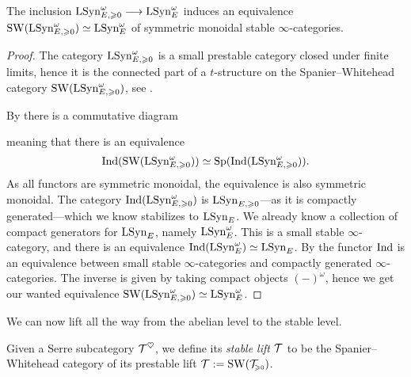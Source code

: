 \begin{theorem}
    \label{ch3:add:thm:prestable-freyd-stabilizes-to-stable-Freyd}
    The inclusion $\mathrm{LSyn}_{E, \geqslant 0}^\omega \longrightarrow \mathrm{LSyn}_{E}^\omega$ induces an equivalence $\operatorname{SW}(\mathrm{LSyn}_{E, \geqslant 0}^\omega)\simeq \mathrm{LSyn}_{E}^\omega$ of symmetric monoidal stable $\infty$-categories. 
\end{theorem}
\begin{proof}
    The category $\mathrm{LSyn}_{E, \geqslant 0}^\omega$ is a small prestable category closed under finite limits, hence it is the connected part of a $t$-structure on the Spanier--Whitehead category $\operatorname{SW}(\mathrm{LSyn}_{E, \geqslant 0}^\omega)$, see \cite[C.1.1, C.1.2]{lurie_SAG}. 

    By \cite[C.1.1.6]{lurie_SAG} there is a commutative diagram
    \begin{center}
    \end{center}
    meaning that there is an equivalence
    \[\operatorname{Ind}(\operatorname{SW}(\mathrm{LSyn}_{E, \geqslant 0}^\omega))\simeq \mathrm{Sp}(\operatorname{Ind}(\mathrm{LSyn}_{E, \geqslant 0}^\omega)).\]
    As all functors are symmetric monoidal, the equivalence is also symmetric monoidal. The category $\operatorname{Ind}(\mathrm{LSyn}_{E, \geqslant 0}^\omega)$ is $\mathrm{LSyn}_{E, \geqslant 0}$---as it is compactly generated---which we know stabilizes to $\mathrm{LSyn}_{E}$. We already know a collection of compact generators for $\mathrm{LSyn}_{E}$, namely $\mathrm{LSyn}_{E}^\omega$. This is a small stable $\infty$-category, and there is an equivalence $\operatorname{Ind}(\mathrm{LSyn}_{E}^\omega)\simeq \mathrm{LSyn}_{E}$. By \cite[5.3.2.11(3)]{Lurie_HA} the functor $\operatorname{Ind}$ is an equivalence between small stable $\infty$-categories and compactly generated $\infty$-categories. The inverse is given by taking compact objects $(-)^\omega$, hence we get our wanted equivalence $\operatorname{SW}(\mathrm{LSyn}_{E, \geqslant 0}^\omega)\simeq \mathrm{LSyn}_{E}^\omega$. 
\end{proof}

We can now lift all the way from the abelian level to the stable level. 

\begin{definition}
    Given a Serre subcategory $\mathcal{T}^\heartsuit$, we define its \emph{stable lift} $\mathcal{T}$ to be the Spanier--Whitehead category of its prestable lift $\mathcal{T}:= \operatorname{SW}(\mathcal{T}_{\hspace{-1pt}\scriptscriptstyle\geqslant 0})$. 
\end{definition}

